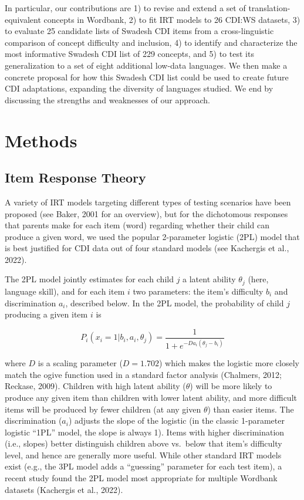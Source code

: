 \documentclass[10pt, letterpaper]{article}
\begin{document}
In particular, our contributions are 1) to revise and extend a set of
translation-equivalent concepts in Wordbank, 2) to fit IRT models to 26
CDI:WS datasets, 3) to evaluate 25 candidate lists of Swadesh CDI items
from a cross-linguistic comparison of concept difficulty and inclusion,
4) to identify and characterize the most informative Swadesh CDI list of
229 concepts, and 5) to test its generalization to a set of eight
additional low-data languages. We then make a concrete proposal for how
this Swadesh CDI list could be used to create future CDI adaptations,
expanding the diversity of languages studied. We end by discussing the
strengths and weaknesses of our approach.

\hypertarget{methods}{%
\section{Methods}\label{methods}}

\hypertarget{item-response-theory}{%
\subsection{Item Response Theory}\label{item-response-theory}}

A variety of IRT models targeting different types of testing scenarios
have been proposed (see Baker, 2001 for an overview), but for the
dichotomous responses that parents make for each item (word) regarding
whether their child can produce a given word, we used the popular
2-parameter logistic (2PL) model that is best justified for CDI data out
of four standard models (see Kachergis et al., 2022).

The 2PL model jointly estimates for each child \(j\) a latent ability
\(\theta_j\) (here, language skill), and for each item \(i\) two
parameters: the item's difficulty \(b_i\) and discrimination \(a_i\),
described below. In the 2PL model, the probability of child \(j\)
producing a given item \(i\) is

\[P_{i}(x_i = 1 | b_{i},a_{i},\theta_j ) = \frac{1}{1 + e^{-D a_{i}(\theta_j - b_i )}}\]

where \(D\) is a scaling parameter (\(D=1.702\)) which makes the
logistic more closely match the ogive function used in a standard factor
analysis (Chalmers, 2012; Reckase, 2009). Children with high latent
ability (\(\theta\)) will be more likely to produce any given item than
children with lower latent ability, and more difficult items will be
produced by fewer children (at any given \(\theta\)) than easier items.
The discrimination (\(a_i\)) adjusts the slope of the logistic (in the
classic 1-parameter logistic ``1PL'' model, the slope is always 1).
Items with higher discrimination (i.e., slopes) better distinguish
children above vs.~below that item's difficulty level, and hence are
generally more useful. While other standard IRT models exist (e.g., the
3PL model adds a ``guessing'' parameter for each test item), a recent
study found the 2PL model most appropriate for multiple Wordbank
datasets (Kachergis et al., 2022).
\end{document}
